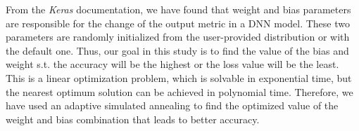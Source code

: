 %


From the \emph{Keras} documentation, we have found that weight and bias parameters are responsible for the change of the output metric in a DNN model. These two parameters are randomly initialized from the user-provided distribution or with the default one. Thus, our goal in this study is to find the value of the bias and weight s.t. the accuracy will be the highest or the loss value will be the least. This is a linear optimization problem, which is solvable in exponential time, but the nearest optimum solution can be achieved in polynomial time. Therefore, we have used an adaptive simulated annealing \cite{ingber2000adaptive} to find the optimized value of the weight and bias combination that leads to better accuracy. 
